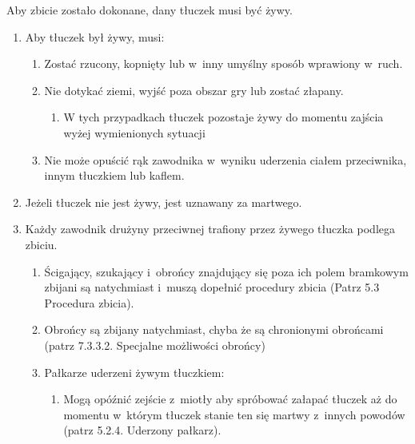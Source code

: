 \documentclass[12pt]{article}
\begin{document}
Aby zbicie zostało dokonane, dany tłuczek musi być żywy.

\begin{enumerate}
	\item
	      Aby tłuczek był żywy, musi:

	      \begin{enumerate}
		      \item
		            Zostać rzucony, kopnięty lub w~inny umyślny sposób wprawiony w~ruch.
		      \item
		            Nie dotykać ziemi, wyjść poza obszar gry lub zostać złapany.

		            \begin{enumerate}
			            \item
			                  W tych przypadkach tłuczek pozostaje żywy do momentu zajścia wyżej
			                  wymienionych sytuacji
		            \end{enumerate}
		      \item
		            Nie może opuścić rąk zawodnika w~wyniku uderzenia ciałem
		            przeciwnika, innym tłuczkiem lub kaflem.
	      \end{enumerate}
	\item
	      Jeżeli tłuczek nie jest żywy, jest uznawany za martwego.
	\item
	      Każdy zawodnik drużyny przeciwnej trafiony przez żywego tłuczka
	      podlega zbiciu.

	      \begin{enumerate}
		      \item
		            Ścigający, szukający i~obrońcy znajdujący się poza ich polem
		            bramkowym zbijani są natychmiast i~muszą dopełnić procedury zbicia
		            (Patrz 5.3 Procedura zbicia).
		      \item
		            Obrońcy są zbijany natychmiast, chyba że są chronionymi obrońcami
		            (patrz 7.3.3.2. Specjalne możliwości obrońcy)
		      \item
		            Pałkarze uderzeni żywym tłuczkiem:

		            \begin{enumerate}
			            \item
			                  Mogą opóźnić zejście z~miotły aby spróbować załapać tłuczek aż do
			                  momentu w~którym tłuczek stanie ten się martwy z~innych powodów
			                  (patrz 5.2.4. Uderzony pałkarz).


\end{enumerate}
\end{enumerate}
\end{enumerate}
\end{document}

